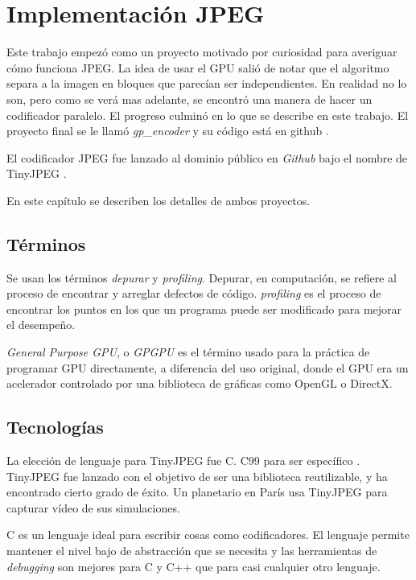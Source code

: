 \chapter{Implementación JPEG}\label{ch:implementacion}

Este trabajo empezó como un proyecto motivado por curiosidad para averiguar
cómo funciona JPEG. La idea de usar el GPU salió de notar que el algoritmo
separa a la imagen en bloques que parecían ser independientes. En realidad no
lo son, pero como se verá mas adelante, se encontró una manera de hacer un
codificador paralelo. El progreso culminó en lo que se describe en este
trabajo. El proyecto final se le llamó \emph{gp\_encoder} y su código está en
github \cite{gp_encoder}.

El codificador JPEG fue lanzado al dominio público en \emph{ Github } bajo el
nombre de TinyJPEG \cite{tiny_jpeg}.

En este capítulo se describen los detalles de ambos proyectos.

\section {Términos} Se usan los términos \emph{\gls{depurar}} y
\emph{\gls{profiling}}. Depurar, en computación, se refiere al proceso de
encontrar y arreglar defectos de código. \emph{profiling} es el proceso de
encontrar los puntos en los que un programa puede ser modificado para mejorar
el desempeño.

\emph{General Purpose GPU}, o \emph{\gls{GPGPU}} es el término usado para la
práctica de programar GPU directamente, a diferencia del uso original, donde
el GPU era un acelerador controlado por una biblioteca de gráficas como OpenGL
o DirectX.

\section{Tecnologías}

La elección de lenguaje para TinyJPEG fue C. C99 para ser específico
\cite{c99}. TinyJPEG fue lanzado con el objetivo de ser una biblioteca
reutilizable, y ha encontrado cierto grado de éxito. Un planetario en París usa
TinyJPEG para capturar vídeo de sus simulaciones.

C es un lenguaje ideal para escribir cosas como codificadores. El lenguaje
permite mantener el nivel bajo de abstracción que se necesita y las
herramientas de \emph{debugging} son mejores para C y C++ que para casi
cualquier otro lenguaje.

